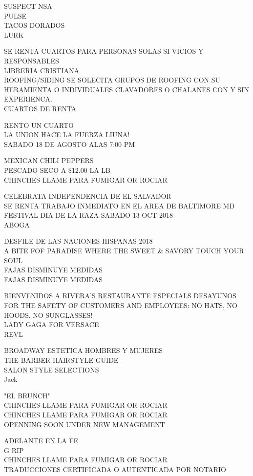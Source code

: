 \documentclass[10pt,letterpaper]{article}
\begin{document}
SUSPECT NSA\\
PULSE\\
TACOS DORADOS\\
LURK

SE RENTA CUARTOS PARA PERSONAS SOLAS SI VICIOS Y RESPONSABLES\\
LIBRERIA CRISTIANA\\
ROOFING/SIDING SE SOLECITA GRUPOS DE ROOFING CON SU HERAMIENTA O INDIVIDUALES CLAVADORES O CHALANES CON Y SIN EXPERIENCA.\\
CUARTOS DE RENTA

RENTO UN CUARTO\\
LA UNION HACE LA FUERZA LIUNA!\\
SABADO 18 DE AGOSTO ALAS 7:00 PM

MEXICAN CHILI PEPPERS\\
PESCADO SECO A \$12.00 LA LB\\
CHINCHES LLAME PARA FUMIGAR OR ROCIAR

CELEBRATA INDEPENDENCIA DE EL SALVADOR\\
SE RENTA TRABAJO INMEDIATO EN EL AREA DE BALTIMORE MD\\
FESTIVAL DIA DE LA RAZA SABADO 13 OCT 2018\\
ABOGA

DESFILE DE LAS NACIONES HISPANAS 2018\\
A BITE FOF PARADISE WHERE THE SWEET \& SAVORY TOUCH YOUR SOUL\\
FAJAS DISMINUYE MEDIDAS\\
FAJAS DISMINUYE MEDIDAS

BIENVENIDOS A RIVERA'S RESTAURANTE ESPECIALS DESAYUNOS\\
FOR THE SAFETY OF CUSTOMERS AND EMPLOYEES: NO HATS, NO HOODS, NO SUNGLASSES!\\
LADY GAGA FOR VERSACE\\
REVL

BROADWAY ESTETICA HOMBRES Y MUJERES\\
THE BARBER HAIRSTYLE GUIDE\\
SALON STYLE SELECTIONS\\
Jack

"EL BRUNCH"\\
CHINCHES LLAME PARA FUMIGAR OR ROCIAR\\
CHINCHES LLAME PARA FUMIGAR OR ROCIAR\\
OPENNING SOON UNDER NEW MANAGEMENT

ADELANTE EN LA FE\\
G RIP\\
CHINCHES LLAME PARA FUMIGAR OR ROCIAR\\
TRADUCCIONES CERTIFICADA O AUTENTICADA POR NOTARIO
\end{document}
